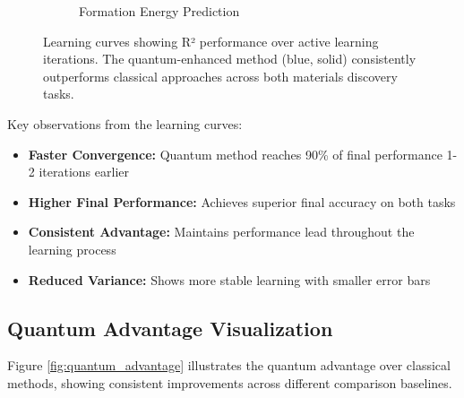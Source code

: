 \documentclass[twocolumn]{article}
\begin{document}
\begin{figure*}[!t]
\begin{subfigure}[b]{0.48\textwidth}
\caption{Formation Energy Prediction}
\label{fig:learning_formation}
\end{subfigure}
\caption{Learning curves showing R² performance over active learning iterations. The quantum-enhanced method (blue, solid) consistently outperforms classical approaches across both materials discovery tasks.}
\label{fig:learning_curves}
\end{figure*}

Key observations from the learning curves:
\begin{itemize}
\item \textbf{Faster Convergence:} Quantum method reaches 90\% of final performance 1-2 iterations earlier
\item \textbf{Higher Final Performance:} Achieves superior final accuracy on both tasks
\item \textbf{Consistent Advantage:} Maintains performance lead throughout the learning process
\item \textbf{Reduced Variance:} Shows more stable learning with smaller error bars
\end{itemize}

\subsection{Quantum Advantage Visualization}

Figure \ref{fig:quantum_advantage} illustrates the quantum advantage over classical methods, showing consistent improvements across different comparison baselines.
\end{document}
